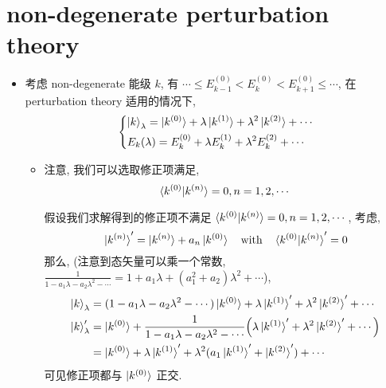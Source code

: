 \section{non-degenerate perturbation theory}
\begin{itemize}
	\item 考虑 non-degenerate 能级 $k$, 有 $\cdots \leq E_{k - 1}^{(0)} < E_k^{(0)} < E_{k + 1}^{(0)} \leq \cdots$, 在 perturbation theory 适用的情况下,
	\begin{equation} \label{C.1.1}
		\begin{dcases}
			\ket{k}_\lambda = \ket{k^{(0)}} + \lambda \ket{k^{(1)}} + \lambda^2 \ket{k^{(2)}} + \cdots \\
			E_k(\lambda) = E_k^{(0)} + \lambda E_k^{(1)} + \lambda^2 E_k^{(2)} + \cdots
		\end{dcases}
	\end{equation}
	\begin{itemize}
			\item 注意, 我们可以选取修正项满足,
			\begin{equation} \label{C.1.2}
				\braket{k^{(0)} | k^{(n)}} = 0, n = 1, 2, \cdots
			\end{equation}
			
			\begin{tcolorbox}[title=proof:]
				假设我们求解得到的修正项不满足 $\braket{k^{(0)} | k^{(n)}} = 0, n = 1, 2, \cdots$, 考虑,
				\begin{equation}
					\ket{k^{(n)}}' = \ket{k^{(n)}} + a_n \ket{k^{(0)}} \quad \text{with} \quad \braket{k^{(0)} | k^{(n)}}' = 0
				\end{equation}
				那么, (注意到态矢量可以乘一个常数, $\frac{1}{1 - a_1 \lambda - a_2 \lambda^2 - \cdots} = 1 + a_1 \lambda + (a_1^2 + a_2) \lambda^2 + \cdots$),
				\begin{align}
					\ket{k}_\lambda &= (1 - a_1 \lambda - a_2 \lambda^2 - \cdots) \ket{k^{(0)}} + \lambda \ket{k^{(1)}}' + \lambda^2 \ket{k^{(2)}}' + \cdots \notag \\
					\ket{k}'_\lambda &= \ket{k^{(0)}} + \frac{1}{1 - a_1 \lambda - a_2 \lambda^2 - \cdots} \Big( \lambda \ket{k^{(1)}}' + \lambda^2 \ket{k^{(2)}}' + \cdots \Big) \notag \\
					&= \ket{k^{(0)}} + \lambda \ket{k^{(1)}}' + \lambda^2 (a_1 \ket{k^{(1)}}' + \ket{k^{(2)}}') + \cdots
				\end{align}
				可见修正项都与 $\ket{k^{(0)}}$ 正交.
			\end{tcolorbox}
			

\end{itemize}
\end{itemize}
